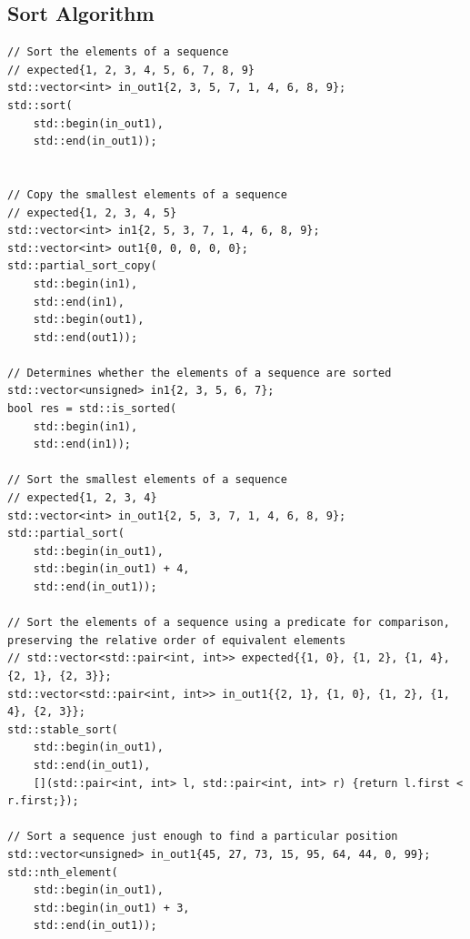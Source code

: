 \subsection{Sort Algorithm}
\begin{lstlisting}
// Sort the elements of a sequence
// expected{1, 2, 3, 4, 5, 6, 7, 8, 9}
std::vector<int> in_out1{2, 3, 5, 7, 1, 4, 6, 8, 9};
std::sort(
	std::begin(in_out1),
	std::end(in_out1));


// Copy the smallest elements of a sequence
// expected{1, 2, 3, 4, 5}
std::vector<int> in1{2, 5, 3, 7, 1, 4, 6, 8, 9};
std::vector<int> out1{0, 0, 0, 0, 0};
std::partial_sort_copy(
	std::begin(in1),
	std::end(in1),
	std::begin(out1),
	std::end(out1));

// Determines whether the elements of a sequence are sorted
std::vector<unsigned> in1{2, 3, 5, 6, 7};
bool res = std::is_sorted(
	std::begin(in1),
	std::end(in1));

// Sort the smallest elements of a sequence
// expected{1, 2, 3, 4}
std::vector<int> in_out1{2, 5, 3, 7, 1, 4, 6, 8, 9};
std::partial_sort(
	std::begin(in_out1),
	std::begin(in_out1) + 4,
	std::end(in_out1));

// Sort the elements of a sequence using a predicate for comparison, preserving the relative order of equivalent elements
// std::vector<std::pair<int, int>> expected{{1, 0}, {1, 2}, {1, 4}, {2, 1}, {2, 3}};
std::vector<std::pair<int, int>> in_out1{{2, 1}, {1, 0}, {1, 2}, {1, 4}, {2, 3}};
std::stable_sort(
	std::begin(in_out1),
	std::end(in_out1),
	[](std::pair<int, int> l, std::pair<int, int> r) {return l.first < r.first;});

// Sort a sequence just enough to find a particular position
std::vector<unsigned> in_out1{45, 27, 73, 15, 95, 64, 44, 0, 99};
std::nth_element(
	std::begin(in_out1),
	std::begin(in_out1) + 3,
	std::end(in_out1));
\end{lstlisting}
\newpage

